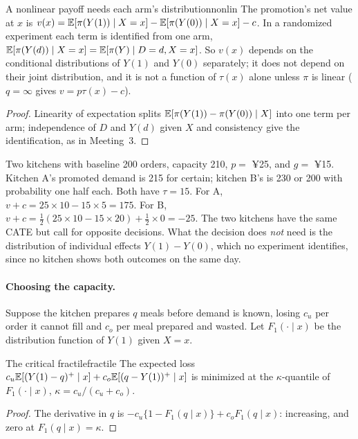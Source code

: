 \documentclass[11pt]{article}
\begin{document}
\begin{prop}{A nonlinear payoff needs each arm's distribution}{nonlin}
The promotion's net value at $x$ is $v(x) = \mathbb{E}[\pi(Y(1)) \mid X = x] - \mathbb{E}[\pi(Y(0)) \mid X = x] - c$. In a randomized experiment
each term is identified from one arm, $\mathbb{E}[\pi(Y(d)) \mid X = x] = \mathbb{E}[\pi(Y) \mid D = d, X = x]$. So $v(x)$ depends on the
conditional distributions of $Y(1)$ and $Y(0)$ separately; it does not depend on their joint distribution, and it is not
a function of $\tau(x)$ alone unless $\pi$ is linear ($q = \infty$ gives $v = p\tau(x) - c$).
\end{prop}
\begin{proof}
Linearity of expectation splits $\mathbb{E}[\pi(Y(1)) - \pi(Y(0)) \mid X]$ into one term per arm; independence of $D$ and $Y(d)$ given $X$
and consistency give the identification, as in Meeting~3.
\end{proof}

Two kitchens with baseline 200 orders, capacity 210, $p = $ ¥25, and $g = $ ¥15. Kitchen A's promoted demand is 215 for
certain; kitchen B's is 230 or 200 with probability one half each. Both have $\tau = 15$. For A,
$v + c = 25 \times 10 - 15 \times 5 = 175$. For B, $v + c = \tfrac12(25 \times 10 - 15 \times 20) + \tfrac12 \times 0 = -25$. The two
kitchens have the same CATE but call for opposite decisions. What the decision does \emph{not} need is the distribution of individual effects $Y(1) - Y(0)$, which no
experiment identifies, since no kitchen shows both outcomes on the same day.

\paragraph{Choosing the capacity.} Suppose the kitchen prepares $q$ meals before demand is known, losing $c_u$ per order it
cannot fill and $c_o$ per meal prepared and wasted. Let $F_1(\cdot \mid x)$ be the distribution function of $Y(1)$ given $X = x$.

\begin{prop}{The critical fractile}{fractile}
The expected loss $c_u\mathbb{E}[(Y(1) - q)^+ \mid x] + c_o\mathbb{E}[(q - Y(1))^+ \mid x]$ is minimized at the $\kappa$-quantile of $F_1(\cdot \mid x)$,
$\kappa = c_u/(c_u + c_o)$.
\end{prop}
\begin{proof}
The derivative in $q$ is $-c_u\{1 - F_1(q \mid x)\} + c_oF_1(q \mid x)$: increasing, and zero at $F_1(q \mid x) = \kappa$.
\end{proof}
\end{document}
